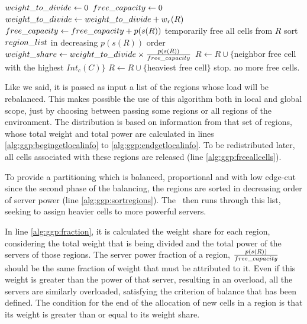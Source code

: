 \begin{algorithm}
\caption{\ggp}
\label{alg:ggp}
\begin{algorithmic}[1]
	 \STATE $weight\_to\_divide \leftarrow 0$ \label{alg:ggp:begingetlocalinfo}
	 \STATE $free\_capacity \leftarrow 0$
	 		\STATE $weight\_to\_divide \leftarrow weight\_to\_divide + w_r(R)$
	 		\STATE $free\_capacity \leftarrow free\_capacity + p(s(R))$
	 		\STATE temporarily free all cells from $R$ \label{alg:ggp:freeallcells}
	 \ENDFOR \label{alg:ggp:endgetlocalinfo}
	 \STATE sort $region\_list$ in decreasing $p(s(R))$ order \label{alg:ggp:sortregions}
	 		\STATE $weight\_share \leftarrow weight\_to\_divide \times \frac{p(s(R))}{free\_capacity}$ \label{alg:ggp:fraction}
	 		 \label{alg:ggp:whilefraction}
	 		   		\STATE $R \leftarrow R \cup \{$neighbor free cell with the highest $Int_c(C)$$\}$ \label{alg:ggp:freeneighbor}
	 		   		\STATE $R \leftarrow R \cup \{$heaviest free cell$\}$ \label{alg:ggp:freeheavycell}
	 		   \ELSE
	 		   		\STATE stop. no more free cells.
	 		   \ENDIF
	 		\ENDWHILE
	 \ENDFOR
\end{algorithmic}
\end{algorithm}

Like we said, it is passed as input a list of the regions whose load will be rebalanced. This makes possible the use of this algorithm both in local and global scope, just by choosing between passing some regions or all regions of the environment. The distribution is based on information from that set of regions, whose total weight and total power are calculated in lines \ref{alg:ggp:begingetlocalinfo} to \ref{alg:ggp:endgetlocalinfo}. To be redistributed later, all cells associated with these regions are released (line \ref{alg:ggp:freeallcells}).

To provide a partitioning which is balanced, proportional and with low edge-cut since the second phase of the balancing, the regions are sorted in decreasing order of server power (line \ref{alg:ggp:sortregions}). The \ggp\ then runs through this list, seeking to assign heavier cells to more powerful servers.%

In line \ref{alg:ggp:fraction}, it is calculated the weight share for each region, considering the total weight that is being divided and the total power of the servers of those regions. The server power fraction of a region, $\frac{p(s(R))}{free\_capacity}$ should be the same fraction of weight that must be attributed to it. Even if this weight is greater than the power of that server, resulting in an overload, all the servers are similarly overloaded, satisfying the criterion of balance that has been defined. The condition for the end of the allocation of new cells in a region is that its weight is greater than or equal to its weight share.

